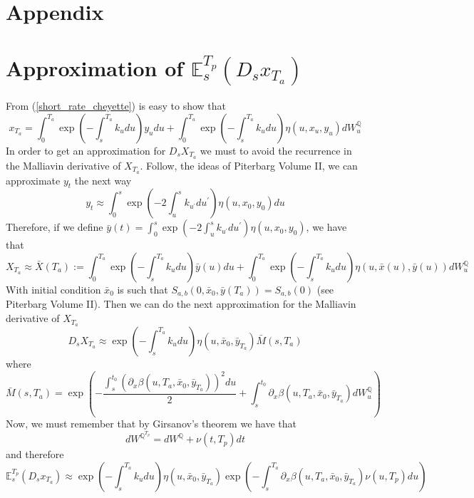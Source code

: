 \documentclass[a4paper,10pt]{article}
\newcommand{\1}{\mathbf{1}}
\begin{document}
\section*{Appendix}
\appendix
\renewcommand{\thesection}{\Alph{section}.\arabic{section}}
\section{Approximation of $\mathbb{E}_s^{T_p}\left(D_s x_{T_a}\right)$}
\label{expected_forward_measure_malliavin_derivative_x_t}
From (\ref{short_rate_cheyette}) is easy to show that
\begin{equation*}
x_{T_a} = \int_{0}^{T_a} \exp\left(-\int_{s}^{T_a}k_u du\right) y_u du + \int_{0}^{T_a}  \exp\left(-\int_{s}^{T_a}k_u du \right) \eta(u,x_u,y_u) dW_u^{\mathbb{Q}}  
\end{equation*}
In order to get an approximation for $D_sX_{T_a}$ we must to avoid the recurrence in the Malliavin derivative of $X_{T_a}$. Follow, the ideas of Piterbarg Volume II, we can approximate $y_t$ the next way
\begin{equation*}
y_t \approx \int_{0}^{s} \exp\left(-2\int_{u}^{s} k_{u^{\prime}} du^{\prime} \right) \eta(u,x_0,y_0) du
\end{equation*}
Therefore, if we define $\bar{y}(t)= \int_{0}^{s} \exp\left(-2\int_{u}^{s} k_{u^{\prime}} du^{\prime} \right) \eta(u,x_0,y_0)$, we have that
\begin{equation*}
X_{T_a} \approx \bar{X}(T_a):=\int_{0}^{T_a} \exp\left(-\int_{s}^{T_a}k_u du\right) \bar{y}(u) du + \int_{0}^{T_a}  \exp\left(-\int_{s}^{T_a}k_u du \right) \eta(u,\bar{x}(u),\bar{y}(u)) dW_u^{\mathbb{Q}}  
\end{equation*}
With initial condition  $\bar{x}_{0}$ is such that $S_{a,b}(0,\bar{x}_0, \bar{y}({T_a})) = S_{a,b}(0)$ (see Piterbarg Volume II). Then we can do the next approximation for the Malliavin derivative of $X_{T_a}$
\begin{equation}\label{approximation_D_s_x_t}
D_sX_{T_a} \approx  \exp\left(-\int_{s}^{T_a}k_u du \right) \eta(u,\bar{x}_0,\bar{y}_{T_a})\bar{M}(s,T_a)
\end{equation}
where
\begin{equation*}
\bar{M}(s,T_a) = \exp\left(-\frac{\int_{s}^{t_0} \left(\partial_x \beta(u,T_a,\bar{x}_0,\bar{y}_{T_a})\right)^{2} du}{2} + \int_{s}^{t_0} \partial_x \beta(u,T_a,\bar{x}_0,\bar{y}_{T_a}) dW^{\mathbb{Q}}_u \right)
\end{equation*}
Now, we must remember that by Girsanov's theorem we have that 
\begin{equation*}
dW^{\mathbb{Q}^{T_p}} = dW^{\mathbb{Q}} + \nu(t,T_p) dt 
\end{equation*}
and therefore 
\begin{equation}\label{approsimation_E_s_x_t}
\mathbb{E}_s^{T_p}\left(D_s x_{T_a}\right) \approx \exp\left(-\int_{s}^{T_a}k_u du \right) \eta(u,\bar{x}_0,\bar{y}_{T_a}) \exp\left(-\int_{s}^{T_a} \partial_x \beta(u,T_a,\bar{x}_0,\bar{y}_{T_a}) \nu(u,T_p) du \right)
\end{equation}



%
\end{document}

